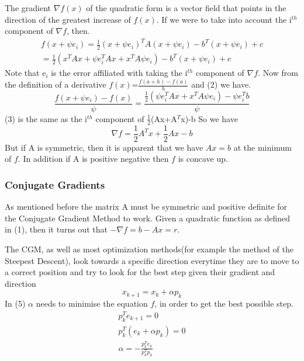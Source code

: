 \documentclass[12pt,a4paper]{article}
\begin{document}
The gradient $\nabla f(x)$ of the quadratic form is a vector field that points in the direction of the greatest increase of $f(x)$. If we were to take into account the i$^{th}$ component of $\nabla f$, then.
\begin{equation}
\begin{split}
f(x+\psi e_i)= \frac{1}{2} (x+\psi e_i)^TA(x+\psi e_i)-b^T(x+\psi e_i)+c\\
= \frac{1}{2} (x^TAx+\psi e^T_iAx +x^TA\psi e_i)-b^T(x+\psi e_i)+c
\end{split}
\end{equation}
Note that e$_i$ is the error affiliated with taking the i$^{th}$ component of $\nabla f$. Now from the definition of a derivative $f(x)$=$\frac{f(a+h)-f(a)}{h}$ and (2) we have.
\begin{equation}
\frac{f(x+\psi e_i)-f(x)}{\psi}=\frac{\frac{1}{2}(\psi e^T_iAx+x^TA\psi e_i)-\psi e^T_ib}{\psi}
\end{equation}
(3) is the same as the i$^{th}$ component of $\frac{1}{2}$(Ax+A$^T$x)-b
So we have
\begin{equation}
\nabla f =\frac{1}{2}A^Tx+\frac{1}{2}Ax-b
\end{equation}
But if A is symmetric, then it is apparent that we have $Ax=b$ at the minimum of $f$. In addition if A is positive negative then $f$ is concave up.
\subsubsection{Conjugate Gradients}
As mentioned before the matrix A must be symmetric and positive definite for the Conjugate Gradient Method to work. Given a quadratic function 
as defined in (1), then it turns out that $-\nabla f=b-Ax=r$.

The CGM, as well as most optimization methods(for example the method of the Steepest Descent\cite{rosenbloom1956method}), look towards a specific direction everytime they are to move to a correct position and try to look for the best step given their gradient and direction
\begin{equation}
x_{k+1} = x_k + \alpha p_k
\end{equation}
In (5) $\alpha$ needs to minimise the equation $f$, in order to get the best possible step.
\begin{equation}
\begin{split}
p^T_ke_{k+1}=0\\
p^T_k(e_k+\alpha p_k)=0\\
\alpha = -\frac{p^T_ke_k}{p^T_kp_k}
\end{split}
\end{equation}
\end{document}
